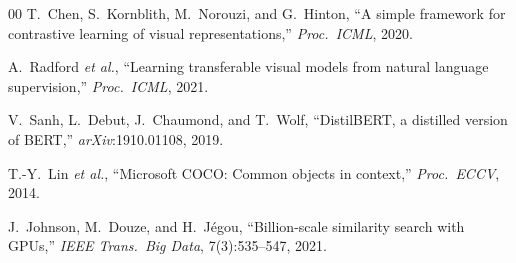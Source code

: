 \documentclass[conference]{IEEEtran}
\begin{document}
\begin{thebibliography}{00}
T.~Chen, S.~Kornblith, M.~Norouzi, and G.~Hinton,
``A simple framework for contrastive learning of visual representations,''
\textit{Proc.\ ICML}, 2020.

A.~Radford \textit{et al.},
``Learning transferable visual models from natural language supervision,''
\textit{Proc.\ ICML}, 2021.

V.~Sanh, L.~Debut, J.~Chaumond, and T.~Wolf,
``DistilBERT, a distilled version of BERT,''
\textit{arXiv}:1910.01108, 2019.

T.-Y.~Lin \textit{et al.},
``Microsoft COCO: Common objects in context,''
\textit{Proc.\ ECCV}, 2014.

J.~Johnson, M.~Douze, and H.~J\'egou,
``Billion-scale similarity search with GPUs,''
\textit{IEEE Trans.\ Big Data}, 7(3):535--547, 2021.
\end{thebibliography}
\end{document}
